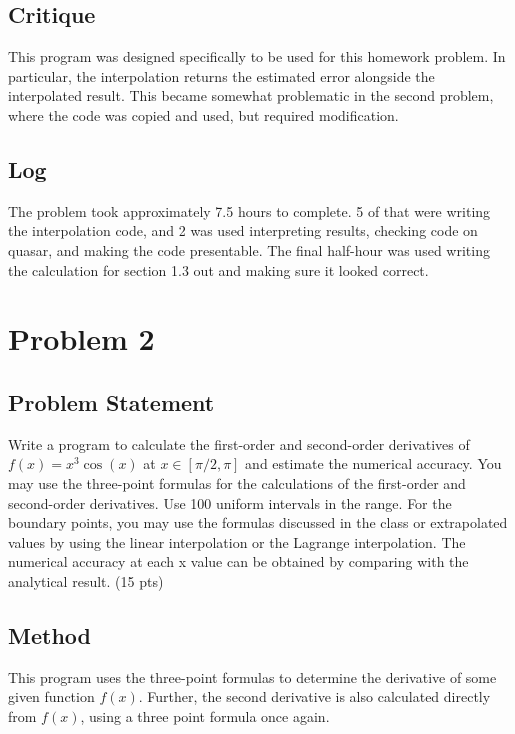 \documentclass[10pt,letter]{article}
\begin{document}
\subsection{Critique}

This program was designed specifically to be used for this homework problem. In particular, the interpolation returns the estimated error alongside the interpolated result. This became somewhat problematic in the second problem, where the code was copied and used, but required modification.

\subsection{Log}

The problem took approximately 7.5 hours to complete. 5 of that were writing the interpolation code, and 2 was used interpreting results, checking code on quasar, and making the code presentable. The final half-hour was used writing the calculation for section 1.3 out and making sure it looked correct.

\pagebreak

\section{Problem 2}

\subsection{Problem Statement}
Write a program to calculate the first-order and second-order derivatives of $f(x) = x^3 \cos(x)$ at
$x \in [\pi/2, \pi]$ and estimate the numerical accuracy. You may use the three-point formulas for the
calculations of the first-order and second-order derivatives. Use 100 uniform intervals in the range.
For the boundary points, you may use the formulas discussed in the class or extrapolated values by
using the linear interpolation or the Lagrange interpolation. The numerical accuracy at each x value
can be obtained by comparing with the analytical result. (15 pts)

\subsection{Method}

This program uses the three-point formulas to determine the derivative of some given function $f(x)$. Further, the second derivative is also calculated directly from $f(x)$, using a three point formula once again.
\end{document}
